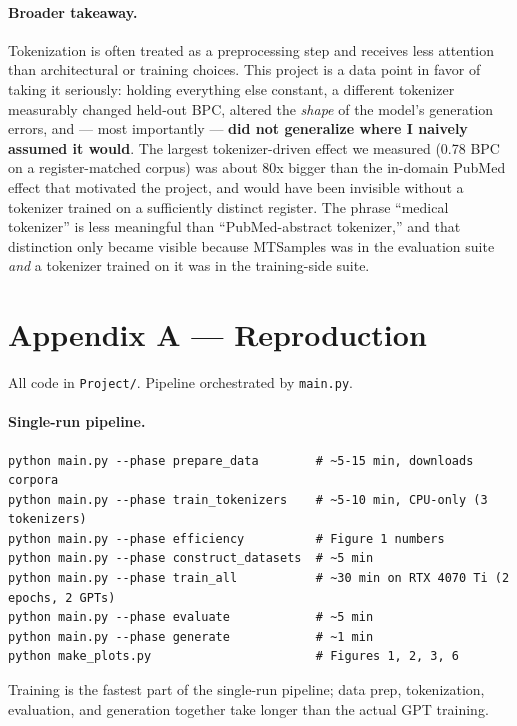 \documentclass[11pt]{article}
\begin{document}
\paragraph{Broader takeaway.}
Tokenization is often treated as a preprocessing step and receives less attention than architectural or training choices. This project is a data point in favor of taking it seriously: holding everything else constant, a different tokenizer measurably changed held-out BPC, altered the \emph{shape} of the model's generation errors, and --- most importantly --- \textbf{did not generalize where I naively assumed it would}. The largest tokenizer-driven effect we measured (0.78 BPC on a register-matched corpus) was about 80x bigger than the in-domain PubMed effect that motivated the project, and would have been invisible without a tokenizer trained on a sufficiently distinct register. The phrase ``medical tokenizer'' is less meaningful than ``PubMed-abstract tokenizer,'' and that distinction only became visible because MTSamples was in the evaluation suite \emph{and} a tokenizer trained on it was in the training-side suite.

\section*{Appendix A --- Reproduction}

All code in \texttt{Project/}. Pipeline orchestrated by \texttt{main.py}.

\paragraph{Single-run pipeline.}

\begin{verbatim}
python main.py --phase prepare_data        # ~5-15 min, downloads corpora
python main.py --phase train_tokenizers    # ~5-10 min, CPU-only (3 tokenizers)
python main.py --phase efficiency          # Figure 1 numbers
python main.py --phase construct_datasets  # ~5 min
python main.py --phase train_all           # ~30 min on RTX 4070 Ti (2 epochs, 2 GPTs)
python main.py --phase evaluate            # ~5 min
python main.py --phase generate            # ~1 min
python make_plots.py                       # Figures 1, 2, 3, 6
\end{verbatim}

Training is the fastest part of the single-run pipeline; data prep, tokenization, evaluation, and generation together take longer than the actual GPT training.
\end{document}
